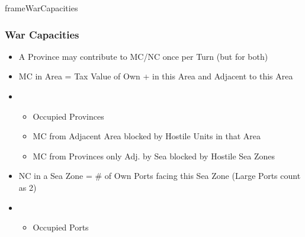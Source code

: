 \documentclass[10pt]{article}
\newlength{\fhWarCapacities} \setlength\fhWarCapacities{17\baselineskip}
\begin{document}
\begin{dynamiccontents*}{frameWarCapacities}\begin{eubox}{\fhWarCapacities}
	\subsubsection*{War Capacities }
	\begin{itemize}
		\item A Province may contribute to MC/NC once per Turn (but for both)
	\end{itemize}	
	\begin{itemize}
		\item MC in Area = Tax Value of Own \towns + \vassals in this Area and Adjacent to this Area
		\item {}
		\begin{itemize}
			\item Occupied Provinces
			\item MC from Adjacent Area blocked by Hostile Units in that Area
			\item MC from Provinces only Adj. by Sea blocked by Hostile Sea Zones
		\end{itemize}
	\end{itemize}
	\begin{itemize}
		\item NC in a Sea Zone = \# of Own Ports facing this Sea Zone (Large Ports count as 2)
		\item {}
		\begin{itemize}
			\item Occupied Ports
		\end{itemize}
	\end{itemize}
\end{eubox}\end{dynamiccontents*}
\end{document}
